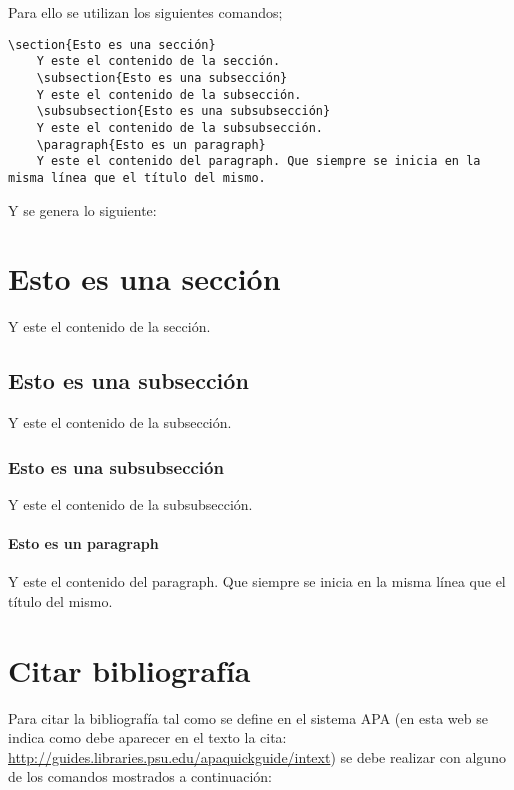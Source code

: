 Para ello se utilizan los siguientes comandos;

\begin{lstlisting}[style=Latex-color]
	\section{Esto es una sección}
	Y este el contenido de la sección.
	\subsection{Esto es una subsección}
	Y este el contenido de la subsección.
	\subsubsection{Esto es una subsubsección}
	Y este el contenido de la subsubsección.
	\paragraph{Esto es un paragraph}
 	Y este el contenido del paragraph. Que siempre se inicia en la misma línea que el título del mismo.
\end{lstlisting}
 Y se genera lo siguiente:
 \section{Esto es una sección}
	Y este el contenido de la sección.
	\subsection{Esto es una subsección}
	Y este el contenido de la subsección.
	\subsubsection{Esto es una subsubsección}
	Y este el contenido de la subsubsección.
	\paragraph{Esto es un paragraph}
 	Y este el contenido del paragraph. Que siempre se inicia en la misma línea que el título del mismo.

\section{Citar bibliografía}
Para citar la bibliografía tal como se define en el sistema APA (en esta web se indica como debe aparecer en el texto la cita: \url{http://guides.libraries.psu.edu/apaquickguide/intext}) se debe realizar con alguno de los comandos mostrados a continuación:

